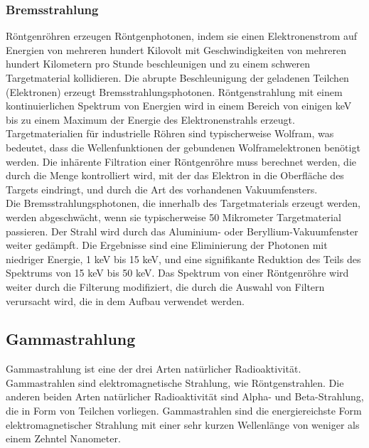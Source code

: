 \subsubsection{Bremsstrahlung}
Röntgenröhren erzeugen Röntgenphotonen, indem sie einen Elektronenstrom auf Energien von mehreren hundert Kilovolt mit Geschwindigkeiten von mehreren hundert Kilometern pro Stunde beschleunigen und zu einem schweren Targetmaterial kollidieren. Die abrupte Beschleunigung der geladenen Teilchen (Elektronen) erzeugt Bremsstrahlungsphotonen. Röntgenstrahlung mit einem kontinuierlichen Spektrum von Energien wird in einem Bereich von einigen keV bis zu einem Maximum der Energie des Elektronenstrahls erzeugt. Targetmaterialien für industrielle Röhren sind typischerweise Wolfram, was bedeutet, dass die Wellenfunktionen der gebundenen Wolframelektronen benötigt werden. Die inhärente Filtration einer Röntgenröhre muss berechnet werden, die durch die Menge kontrolliert wird, mit der das Elektron in die Oberfläche des Targets eindringt, und durch die Art des vorhandenen Vakuumfensters.\\
Die Bremsstrahlungsphotonen, die innerhalb des Targetmaterials erzeugt werden, werden abgeschwächt, wenn sie typischerweise 50 Mikrometer Targetmaterial passieren. Der Strahl wird durch das Aluminium- oder Beryllium-Vakuumfenster weiter gedämpft. Die Ergebnisse sind eine Eliminierung der Photonen mit niedriger Energie, 1 keV bis 15 keV, und eine signifikante Reduktion des Teils des Spektrums von 15 keV bis 50 keV. Das Spektrum von einer Röntgenröhre wird weiter durch die Filterung modifiziert, die durch die Auswahl von Filtern verursacht wird, die in dem Aufbau verwendet werden.
\subsection{Gammastrahlung}
Gammastrahlung ist eine der drei Arten natürlicher Radioaktivität. Gammastrahlen sind elektromagnetische Strahlung, wie Röntgenstrahlen. Die anderen beiden Arten natürlicher Radioaktivität sind Alpha- und Beta-Strahlung, die in Form von Teilchen vorliegen. Gammastrahlen sind die energiereichste Form elektromagnetischer Strahlung mit einer sehr kurzen Wellenlänge von weniger als einem Zehntel Nanometer.

